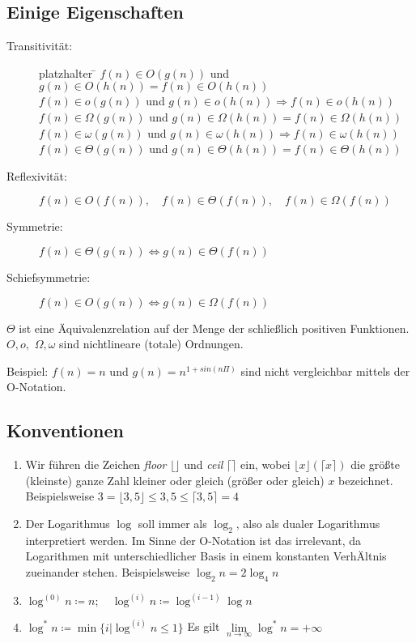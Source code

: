 \documentclass[ngerman,draft,parskip=half*,twoside]{scrreprt}
\theoremstyle{break}
\begin{document}
\subsection{Einige Eigenschaften}
\begin{description}
\item[Transitivität:]
\begin{tabbing}
platzhalter \= \kill
        \> $f(n) \in O(g(n))$ und $g(n) \in O(h(n))=f(n) \in O(h(n))$\\
        \> $f(n) \in o(g(n))$ und $g(n) \in o(h(n)) \Rightarrow f(n) \in o(h(n))$\\
        \> $f(n) \in \Omega(g(n))$ und $g(n) \in \Omega(h(n))=f(n) \in \Omega(h(n))$\\
        \> $f(n) \in \omega(g(n))$ und $g(n) \in \omega(h(n)) \Rightarrow f(n) \in \omega(h(n))$\\
        \> $f(n) \in \Theta(g(n))$ und $g(n) \in \Theta(h(n))=f(n) \in \Theta(h(n))$
\end{tabbing}
\item[Reflexivität:]
        $f(n) \in O(f(n)), \quad f(n) \in \Theta(f(n)), \quad f(n) \in \Omega(f(n))$
\item[Symmetrie:]
        $f(n) \in \Theta(g(n)) \Leftrightarrow g(n) \in \Theta(f(n))$
\item[Schiefsymmetrie:]
        $f(n) \in O(g(n)) \Leftrightarrow g(n) \in \Omega(f(n))$
\end{description}
$\Theta$ ist eine Äquivalenzrelation auf der Menge der schließlich positiven Funktionen.
$O,o,$ $\Omega,\omega$ sind nichtlineare (totale) Ordnungen.

Beispiel: $f(n)=n$ und $g(n)=n^{1+sin(n\Pi)}$ sind nicht vergleichbar mittels der O-Notation.

\subsection{Konventionen}
\begin{enumerate}
\item   Wir führen die Zeichen \emph{floor} $ \lfloor \rfloor$ und \emph{ceil} $\lceil \rceil$ ein,
        wobei $\lfloor x \rfloor ( \lceil x \rceil)$ die größte (kleinste) ganze Zahl kleiner oder gleich
        (größer oder gleich) $x$ bezeichnet. Beispielsweise $3=\lfloor 3,5\rfloor \leq 3,5 \leq \lceil 3,5 \rceil=4$
\item   Der Logarithmus $\log$ soll immer als $\log_2$, also als dualer Logarithmus interpretiert werden. Im Sinne der O-Notation ist das
irrelevant, da Logarithmen mit unterschiedlicher Basis in einem konstanten VerhÄltnis zueinander stehen. Beispielsweise $\log_2 n = 2 \log_4 n$
\item   $\log^{(0)}n \coloneqq n; \quad \log^{(i)}n \coloneqq \log^{(i-1)}\log n$
\item   $\log^{*}n \coloneqq \min \{i |\log^{(i)}n \leq1 \}$ Es gilt $ \lim\limits_{n \rightarrow \infty}{\log^{*}n} = + \infty$
\end{enumerate}
\end{document}
